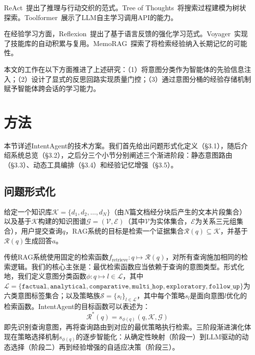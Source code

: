 \documentclass[runningheads]{llncs}
\begin{document}
ReAct~\cite{ref13}提出了推理与行动交织的范式。Tree of Thoughts~\cite{ref14}将搜索过程建模为树状探索。Toolformer~\cite{ref15}展示了LLM自主学习调用API的能力。

在经验学习方面，Reflexion~\cite{ref16}提出了基于语言反馈的强化学习范式。Voyager~\cite{ref17}实现了技能库的自动积累与复用。MemoRAG~\cite{ref18}探索了将检索经验纳入长期记忆的可能性。

本文的工作在以下方面推进了上述研究：（1）将意图分类作为智能体的先验信息注入；（2）设计了显式的反思回路实现质量门控；（3）通过意图分桶的经验存储机制赋予智能体跨会话的学习能力。

\section{方法}

本节详述IntentAgent的技术方案。我们首先给出问题形式化定义（\S3.1），随后介绍系统总览（\S3.2），之后分三个小节分别阐述三个渐进阶段：静态意图路由（\S3.3）、动态工具编排（\S3.4）和经验记忆增强（\S3.5）。

\subsection{问题形式化}

给定一个知识库$\mathcal{K} = \{d_1, d_2, \ldots, d_N\}$（由$N$篇文档经分块后产生的文本片段集合）以及基于$\mathcal{K}$构建的知识图谱$\mathcal{G} = (\mathcal{V}, \mathcal{E})$（其中$\mathcal{V}$为实体集合，$\mathcal{E}$为关系三元组集合），用户提交查询$q$，RAG系统的目标是检索一个证据集合$\mathcal{R}(q) \subseteq \mathcal{K}$，并基于$\mathcal{R}(q)$生成回答$a$。

传统RAG系统使用固定的检索函数$f_{\text{retrieve}}: q \mapsto \mathcal{R}(q)$，对所有查询施加相同的检索逻辑。我们的核心主张是：最优检索函数应当依赖于查询的意图类型。形式化地，我们定义意图分类函数$\phi: q \mapsto l \in \mathcal{L}$，其中$\mathcal{L} = \{\texttt{factual}, \texttt{analytical}, \texttt{comparative}, \texttt{multi\_hop}, \texttt{exploratory}, \texttt{follow\_up}\}$为六类意图标签集合；以及策略族$\mathcal{S} = \{s_l\}_{l \in \mathcal{L}}$，其中每个策略$s_l$是面向意图$l$优化的检索函数。IntentAgent的目标函数可以表述为：
\begin{equation}
    \mathcal{R}^*(q) = s_{\phi(q)}(q, \mathcal{K}, \mathcal{G})
\end{equation}
即先识别查询意图，再将查询路由到对应的最优策略执行检索。三阶段渐进演化体现在策略选择机制$s_{\phi(q)}$的逐步智能化：从确定性映射（阶段一）到LLM驱动的动态选择（阶段二）再到经验增强的自适应决策（阶段三）。
\end{document}
